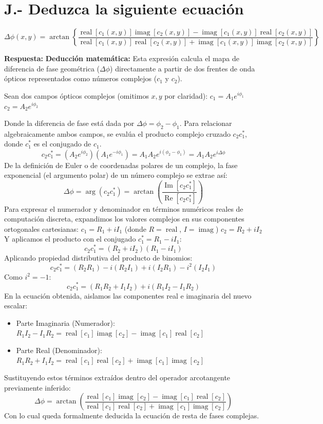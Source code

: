 \documentclass[12pt,letterpaper]{article}
\begin{document}
	\section*{J.- Deduzca la siguiente ecuación}
		\[
		\Delta\phi(x,y) = \arctan\left\{ \frac{\operatorname{real}[c_1(x,y)]\operatorname{imag}[c_2(x,y)] - \operatorname{imag}[c_1(x,y)]\operatorname{real}[c_2(x,y)]}{\operatorname{real}[c_1(x,y)]\operatorname{real}[c_2(x,y)] + \operatorname{imag}[c_1(x,y)]\operatorname{imag}[c_2(x,y)]} \right\}
		\]
	
	\textbf{Respuesta:}
	\textbf{Deducción matemática:}
	Esta expresión calcula el mapa de diferencia de fase geométrica ($\Delta\phi$) directamente a partir de dos frentes de onda ópticos representados como números complejos ($c_1$ y $c_2$).
	
	Sean dos campos ópticos complejos (omitimos $x,y$ por claridad):
	$c_1 = A_1 e^{i\phi_1}$
	$c_2 = A_2 e^{i\phi_2}$
	
	Donde la diferencia de fase está dada por $\Delta\phi = \phi_2 - \phi_1$.
	Para relacionar algebraicamente ambos campos, se evalúa el producto complejo cruzado $c_2 c_1^*$, donde $c_1^*$ es el conjugado de $c_1$.
	\[
	c_2 c_1^* = (A_2 e^{i\phi_2})(A_1 e^{-i\phi_1}) = A_1 A_2 e^{i(\phi_2 - \phi_1)} = A_1 A_2 e^{i\Delta\phi}
	\]
	De la definición de Euler o de coordenadas polares de un complejo, la fase exponencial (el argumento polar) de un número complejo se extrae así:
	\[
	\Delta\phi = \arg(c_2 c_1^*) = \arctan\left(\frac{\operatorname{Im}[c_2 c_1^*]}{\operatorname{Re}[c_2 c_1^*]}\right)
	\]
	Para expresar el numerador y denominador en términos numéricos reales de computación discreta, expandimos los valores complejos en sus componentes ortogonales cartesianas:
	$c_1 = R_1 + i I_1$  (donde $R = \operatorname{real}$, $I = \operatorname{imag}$)
	$c_2 = R_2 + i I_2$
	Y aplicamos el producto con el conjugado $c_1^* = R_1 - i I_1$:
	\[
	c_2 c_1^* = (R_2 + i I_2)(R_1 - i I_1)
	\]
	Aplicando propiedad distributiva del producto de binomios:
	\[
	c_2 c_1^* = (R_2 R_1) - i(R_2 I_1) + i(I_2 R_1) - i^2(I_2 I_1)
	\]
	Como $i^2 = -1$:
	\[
	c_2 c_1^* = (R_1 R_2 + I_1 I_2) + i(R_1 I_2 - I_1 R_2)
	\]
	En la ecuación obtenida, aislamos las componentes real e imaginaria del nuevo escalar:
	\begin{itemize}
		\item Parte Imaginaria (Numerador): $R_1 I_2 - I_1 R_2 = \operatorname{real}[c_1]\operatorname{imag}[c_2] - \operatorname{imag}[c_1]\operatorname{real}[c_2]$
		\item Parte Real (Denominador): $R_1 R_2 + I_1 I_2 = \operatorname{real}[c_1]\operatorname{real}[c_2] + \operatorname{imag}[c_1]\operatorname{imag}[c_2]$
	\end{itemize}
	Sustituyendo estos términos extraídos dentro del operador arcotangente previamente inferido:
	\[
	\Delta\phi = \arctan\left( \frac{\operatorname{real}[c_1]\operatorname{imag}[c_2] - \operatorname{imag}[c_1]\operatorname{real}[c_2]}{\operatorname{real}[c_1]\operatorname{real}[c_2] + \operatorname{imag}[c_1]\operatorname{imag}[c_2]} \right)
	\]
	Con lo cual queda formalmente deducida la ecuación de resta de fases complejas.
	
\end{document}
